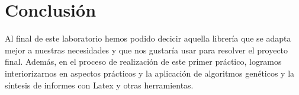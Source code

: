 \documentclass[9pt,conference]{IEEEtran}
\begin{document}




	\section{Conclusi\'on}
	Al final de este laboratorio hemos podido decicir aquella librer\'ia que se adapta mejor a nuestras necesidades y que nos gustar\'ia usar para resolver el proyecto final. Adem\'as, en el proceso de realizaci\'on de este primer pr\'actico, logramos interiorizarnos en aspectos pr\'acticos y la aplicaci\'on de algoritmos gen\'eticos y la s\'intesis de informes con Latex y otras herramientas.



	
	{}
\end{document}
